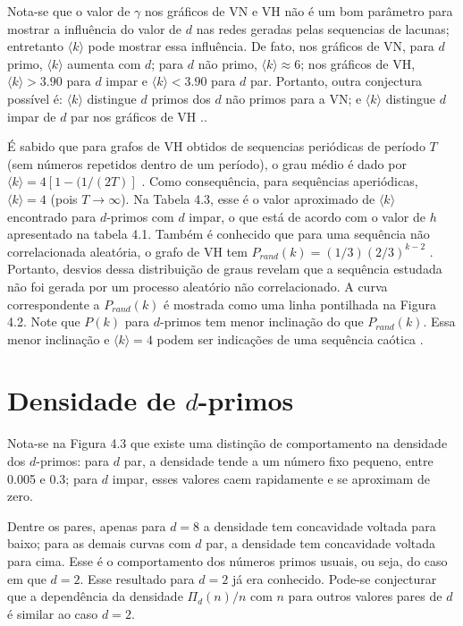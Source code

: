 \documentclass[12pt,a4paper,fleqn]{report}
\begin{document}
Nota-se que o valor de $\gamma$ nos gráficos de VN e VH não é um bom parâmetro
para mostrar a influência do valor de $d$ nas redes geradas pelas sequencias
de lacunas; entretanto $\langle k \rangle$ pode mostrar essa influência. De fato, nos gráficos de VN, para $d$
primo, $\langle k \rangle$ aumenta com $d$; para $d$ não primo,
$\langle k \rangle \approx 6$; nos gráficos de VH, $\langle k \rangle >
3.90$ para $d$ impar e $\langle k \rangle < 3.90$ para $d$ par.
Portanto, outra conjectura possível é: $\langle k \rangle$ distingue
$d$ primos dos $d$ não primos para a VN; e $\langle k \rangle$ distingue
$d$ impar de $d$ par nos gráficos de VH \cite{me_2020}..

É sabido que para grafos de VH obtidos de sequencias periódicas de período
$T$ (sem números repetidos dentro de um período), o grau médio é dado por
$\langle k \rangle = 4[1-(1/(2T)]$ \cite{a310}. Como consequência, para
sequências aperiódicas, $\langle k \rangle = 4$ (pois $T \to \infty$).
Na Tabela 4.3, esse é o valor aproximado de
$\langle k \rangle$ encontrado para $d$-primos com $d$ impar, o que está
de acordo com o valor de $h$ apresentado na tabela 4.1.
Também é conhecido que para uma sequência não correlacionada aleatória,
o grafo de VH tem $P_{rand}(k)= (1/3)(2/3)^{k-2}$ \cite{a310}. Portanto, 
desvios dessa distribuição de graus revelam que a sequência estudada não
foi gerada por um processo aleatório não correlacionado. A curva correspondente
a $P_{rand}(k)$ é mostrada como uma linha pontilhada na Figura 4.2.
Note que $P(k)$ para $d$-primos tem menor inclinação do que $P_{rand}(k)$.
Essa menor inclinação e $\langle k \rangle = 4$ podem ser indicações de
uma sequência caótica \cite{a310}.


\section{Densidade de $d$-primos}

Nota-se na Figura 4.3 que existe uma distinção de comportamento na densidade dos $d$-primos:
para $d$ par, a densidade tende a um número fixo pequeno, entre 0.005 e 0.3;
para $d$ impar, esses valores caem rapidamente e se aproximam de zero.

Dentre os pares, apenas para $d=8$ a densidade tem concavidade voltada para baixo; para as demais curvas com $d$ par, a densidade tem concavidade voltada para cima. Esse é o comportamento dos números primos usuais, ou seja, do caso em que $d=2$. Esse resultado para $d=2$ já era conhecido. Pode-se conjecturar que a dependência da densidade $\Pi_d(n)/n$ com $n$  para outros valores pares de $d$ é similar ao caso $d=2$.
\end{document}
